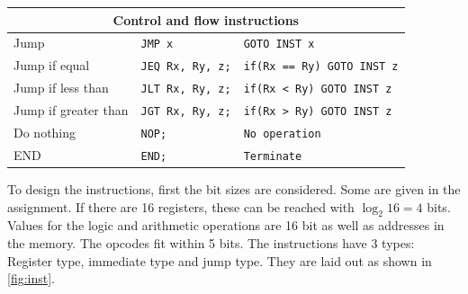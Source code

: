 \documentclass[a4paper, english]{article}
\numberwithin{equation}{section}
\begin{document}
\begin{table}[H]
\begin{tabular}{lll}
        \midrule
        \multicolumn{3}{c}{Control and flow instructions}                                    \\
        \midrule
        Jump                  & \texttt{JMP x}           & \texttt{GOTO INST x}              \\
        Jump if equal         & \texttt{JEQ Rx, Ry, z;}  & \texttt{if(Rx == Ry) GOTO INST z} \\
        Jump if less than     & \texttt{JLT Rx, Ry, z;}  & \texttt{if(Rx < Ry) GOTO INST z}  \\
        Jump if greater than  & \texttt{JGT Rx, Ry, z;}  & \texttt{if(Rx > Ry) GOTO INST z}  \\
        Do nothing            & \texttt{NOP;}            & \texttt{No operation}             \\
        END                   & \texttt{END;}            & \texttt{Terminate}                \\
        \bottomrule
    \end{tabular}
\end{table}
To design the instructions, first the bit sizes are considered. Some are given in the assignment. If there are 16 registers, these can be reached with \(\log_2{16} = 4\) bits. Values for the logic and arithmetic operations are 16 bit as well as addresses in the memory. The opcodes fit within 5 bits.\newline
The instructions have 3 types: Register type, immediate type and jump type. They are laid out as shown in \cref{fig:inst}.
\end{document}
